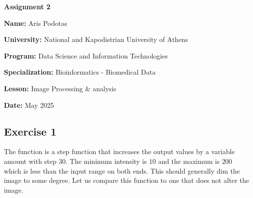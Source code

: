 \documentclass[12pt, a4paper]{article}
\author{Aris Podotas}
\date{today}
\begin{document}
\begin{titlepage}
    \centering
    {\huge \textbf{Assignment 2}\par}
    \vspace{0.5cm}
    {\Large \textbf{Name:} Aris Podotas\par}
    \vspace{0.5cm}
    {\large \textbf{University:} National and Kapodistrian University of Athens\par}
    \vspace{0.5cm}
    {\large \textbf{Program:} Data Science and Information Technologies\par}
    \vspace{0.5cm}
    {\large \textbf{Specialization:} Bioinformatics - Biomedical Data\par}
    \vspace{0.5cm}
    {\large \textbf{Lesson:} Image Processing \& analysis \par}
    \vspace{0.5cm}
    {\large \textbf{Date:} May 2025\par}
    \tableofcontents
\end{titlepage}

\begin{multicols}{2}

    \section{Exercise 1} \label{sec:ex1}

    The function is a step function that increases the output values by a variable amount with step $30$. The minimum intensity is $10$ and the maximum is $200$ which is less than the input range on both ends. This should generally dim the image to some degree. Let us compare this function to one that does not alter the image.
    \newline

\end{multicols}
\end{document}
